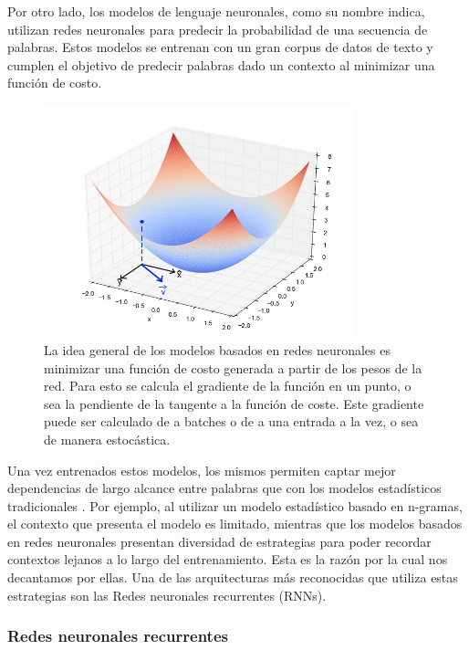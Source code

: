 Por otro lado, los modelos de lenguaje neuronales, como su nombre indica, utilizan redes neuronales para predecir la probabilidad de una secuencia de palabras. Estos modelos se entrenan con un gran corpus de datos de texto y cumplen el objetivo de predecir palabras dado un contexto al minimizar una función de costo.

\begin{figure}[H]
    \centering
    \includegraphics[width=0.8\textwidth]{imagenes/function.jpg}
    \caption{La idea general de los modelos basados en redes neuronales es minimizar una función de costo generada a partir de los pesos de la red. Para esto se calcula el gradiente de la función en un punto, o sea la pendiente de la tangente a la función de coste. Este gradiente puede ser calculado de a batches o de a una entrada a la vez, o sea de manera estocástica.}
    \label{fig:gradiente}
\end{figure}

Una vez entrenados estos modelos, los mismos permiten captar mejor dependencias de largo alcance entre palabras que con los modelos estadísticos tradicionales \parencite{Wang2017ngram}. Por ejemplo, al utilizar un modelo estadístico basado en n-gramas, el contexto que presenta el modelo es limitado, mientras que los modelos basados en redes neuronales presentan diversidad de estrategias para poder recordar contextos lejanos a lo largo del entrenamiento. Esta es la razón por la cual nos decantamos por ellas. Una de las arquitecturas más reconocidas que utiliza estas estrategias son las Redes neuronales recurrentes (RNNs).

\subsubsection{Redes neuronales recurrentes}

